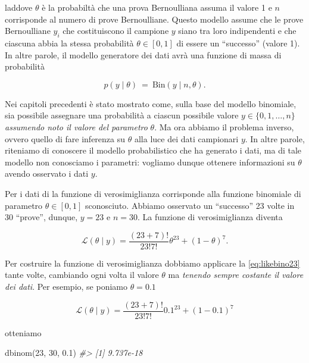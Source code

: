 \documentclass[
  11pt,
]{krantz}
\makeatletter
\newenvironment{Shaded}{\begin{snugshade}}{\end{snugshade}}
\newcommand{\CommentTok}[1]{\textcolor[rgb]{0.37,0.37,0.37}{\textit{#1}}}
\newcommand{\DecValTok}[1]{\textcolor[rgb]{0.06,0.06,0.06}{#1}}
\newcommand{\FloatTok}[1]{\textcolor[rgb]{0.06,0.06,0.06}{#1}}
\newcommand{\FunctionTok}[1]{\textcolor[rgb]{0,0,0}{#1}}
\newcommand{\NormalTok}[1]{#1}
\newenvironment{kframe}{%
\medskip{}
\setlength{\fboxsep}{.8em}
 \def\at@end@of@kframe{}%
 \ifinner\ifhmode%
  \def\at@end@of@kframe{\end{minipage}}%
  \begin{minipage}{\columnwidth}%
 \fi\fi%
 \def\FrameCommand##1{\hskip\@totalleftmargin \hskip-\fboxsep
 \colorbox{shadecolor}{##1}\hskip-\fboxsep
     \hskip-\linewidth \hskip-\@totalleftmargin \hskip\columnwidth}%
 \MakeFramed {\advance\hsize-\width
   \@totalleftmargin\z@ \linewidth\hsize
   \@setminipage}}%
 {\par\unskip\endMakeFramed%
 \at@end@of@kframe}
\renewenvironment{Shaded}{\begin{kframe}}{\end{kframe}}
\theoremstyle{definition}
\theoremstyle{definition}
\theoremstyle{definition}
\theoremstyle{definition}
\theoremstyle{remark}
\makeatother
\begin{document}
laddove \(\theta\) è la probabiltà che una prova Bernoulliana assuma il valore 1 e \(n\) corrisponde al numero di prove Bernoulliane. Questo modello assume che le prove Bernoulliane \(y_i\) che costituiscono il campione \(y\) siano tra loro indipendenti e che ciascuna abbia la stessa probabilità \(\theta \in [0, 1]\) di essere un ``successo'' (valore 1). In altre parole, il modello generatore dei dati avrà una funzione di massa di probabilità

\[
p(y \mid \theta)
\ = \
\mbox{Bin}(y \mid n, \theta).
\]

Nei capitoli precedenti è stato mostrato come, sulla base del modello binomiale, sia possibile assegnare una probabilità a ciascun possibile valore \(y \in \{0, 1, \dots, n\}\) \emph{assumendo noto il valore del parametro} \(\theta\). Ma ora abbiamo il problema inverso, ovvero quello di fare inferenza su \(\theta\) alla luce dei dati campionari \(y\). In altre parole, riteniamo di conoscere il modello probabilistico che ha generato i dati, ma di tale modello non conosciamo i parametri: vogliamo dunque ottenere informazioni su \(\theta\) avendo osservato i dati \(y\).

Per i dati di \citet{zetschefuture2019} la funzione di verosimiglianza corrisponde alla funzione binomiale di parametro \(\theta \in [0, 1]\) sconosciuto. Abbiamo osservato un ``successo'' 23 volte in 30 ``prove'', dunque, \(y = 23\) e \(n = 30\). La funzione di verosimiglianza diventa

\begin{equation}
\mathcal{L}(\theta \mid y) = \frac{(23 + 7)!}{23!7!} \theta^{23} + (1-\theta)^7.
\label{eq:likebino23}
\end{equation}

Per costruire la funzione di verosimiglianza dobbiamo applicare la \eqref{eq:likebino23} tante volte, cambiando ogni volta il valore \(\theta\) ma \emph{tenendo sempre costante il valore dei dati}. Per esempio, se poniamo \(\theta = 0.1\)

\[
\mathcal{L}(\theta \mid y) = \frac{(23 + 7)!}{23!7!} 0.1^{23} + (1-0.1)^7
\]

otteniamo

\begin{Shaded}
\begin{Highlighting}[]
\FunctionTok{dbinom}\NormalTok{(}\DecValTok{23}\NormalTok{, }\DecValTok{30}\NormalTok{, }\FloatTok{0.1}\NormalTok{)}
\CommentTok{\#\textgreater{} [1] 9.737e{-}18}
\end{Highlighting}
\end{Shaded}
\end{document}
